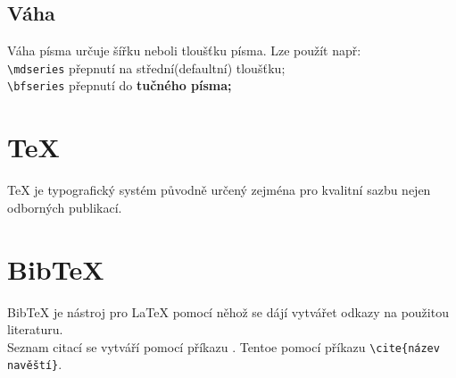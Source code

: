 \documentclass[a4paper, 11pt]{article}
\begin{document}
\subsection{Váha}
Váha písma určuje šířku neboli tloušťku písma. Lze použít např: \\
\verb|\mdseries| \hspace{0.5cm} přepnutí na střední(defaultní) tloušťku; \\
\verb|\bfseries| \hspace{0.5cm} přepnutí do \bfseries tučného \normalfont písma;
\cite{latex_kompletni_pruvodce, typograficky_manual}

\section{\TeX}
\TeX \- je typografický systém původně určený zejména pro kvalitní sazbu  nejen odborných publikací.
\cite{dipl_martin_cerny}

\section{Bib\TeX}
Bib\TeX \- je nástroj pro \LaTeX \- pomocí něhož se dájí vytvářet odkazy na použitou literaturu.    \\
Seznam citací se vytváří pomocí příkazu \verb||. Tentoe pomocí příkazu \verb|\cite{název navěští}|.


\pagebreak
\newpage

\def\refname{Literatura}

\end{document}
